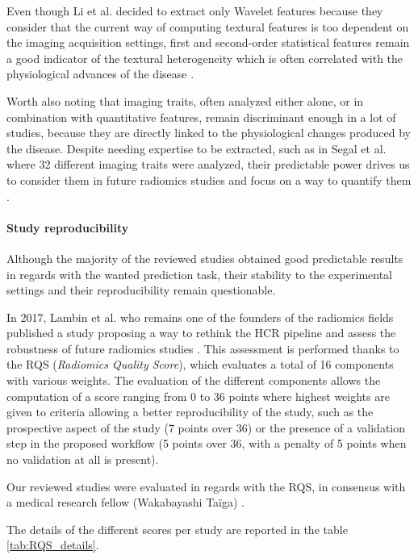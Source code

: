 \documentclass[]{article}
\let\oldparagraph\paragraph
\renewcommand{\paragraph}[1]{\oldparagraph{#1}\mbox{}}
\begin{document}
Even though Li et al. decided to extract only Wavelet features
because they consider that the current way of computing textural
features is too dependent on the imaging acquisition settings, first and
second-order statistical features remain a good indicator of the
textural heterogeneity which is often correlated with the physiological
advances of the disease \cite{Li2016}.

Worth also noting that imaging traits, often analyzed either alone, or
in combination with quantitative features, remain discriminant enough in
a lot of studies, because they are directly linked to the physiological
changes produced by the disease. Despite needing expertise to be
extracted, such as in Segal et al. where 32 different imaging
traits were analyzed, their predictable power drives us to consider them
in future radiomics studies and focus on a way to quantify them \cite{Segal2007}.

\paragraph{Study reproducibility}\label{study-reproducibility}

Although the majority of the reviewed studies obtained good predictable
results in regards with the wanted prediction task, their stability to
the experimental settings and their reproducibility remain questionable.

In 2017, Lambin et al. who remains one of the founders of the
radiomics fields \cite{Lambin2012} published a study
proposing a way to rethink the HCR pipeline and assess the robustness of
future radiomics studies \cite{Lambin2017}. This
assessment is performed thanks to the RQS (\emph{Radiomics Quality
Score}), which evaluates a total of 16 components with various weights.
The evaluation of the different components allows the computation of a
score ranging from 0 to 36 points where highest weights are given to
criteria allowing a better reproducibility of the study, such as the
prospective aspect of the study (7 points over 36) or the presence of a
validation step in the proposed workflow (5 points over 36, with a
penalty of 5 points when no validation at all is present).

Our reviewed studies were evaluated in regards with the RQS, in
consensus with a medical research fellow (Wakabayashi Taïga) \cite{Wakabayashi2019}.

The details of the different scores per study are reported in the table \ref{tab:RQS_details}.
\end{document}
